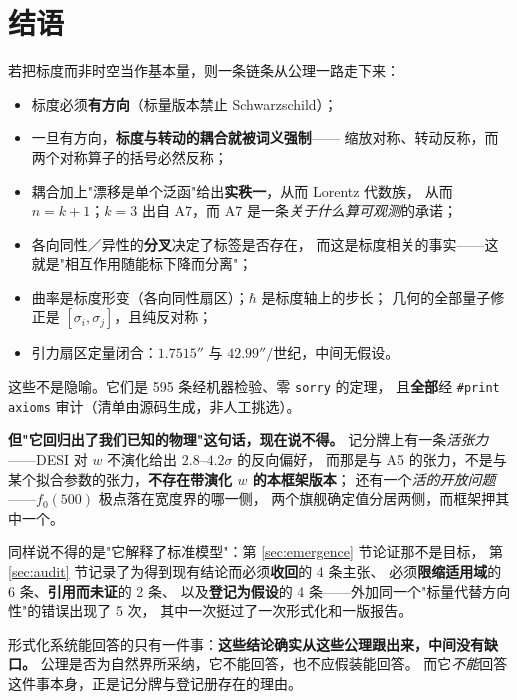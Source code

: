 \documentclass[11pt,a4paper]{article}
\theoremstyle{sudef}
\begin{document}
\section{结语}

若把标度而非时空当作基本量，则一条链条从公理一路走下来：

\begin{itemize}[leftmargin=1.6em,itemsep=2pt]
\item 标度必须\textbf{有方向}（标量版本禁止 Schwarzschild）；
\item 一旦有方向，\textbf{标度与转动的耦合就被词义强制}——
      缩放对称、转动反称，而两个对称算子的括号必然反称；
\item 耦合加上"漂移是单个泛函"给出\textbf{实秩一}，从而 Lorentz 代数族，
      从而 $n=k+1$；$k=3$ 出自 A7，而 A7 是一条\emph{关于什么算可观测}的承诺；
\item 各向同性／异性的\textbf{分叉}决定了标签是否存在，
      而这是标度相关的事实——这就是"相互作用随能标下降而分离"；
\item 曲率是标度形变（各向同性扇区）；$\hbar$ 是标度轴上的步长；
      几何的全部量子修正是 $[\sigma_i,\sigma_j]$，且纯反对称；
\item 引力扇区定量闭合：$1.7515''$ 与 $42.99''/$世纪，中间无假设。
\end{itemize}

\medskip
\noindent
这些不是隐喻。它们是 595 条经机器检验、零 \texttt{sorry} 的定理，
且\textbf{全部}经 \texttt{\#print axioms} 审计（清单由源码生成，非人工挑选）。

\medskip
\noindent\textbf{但"它回归出了我们已知的物理"这句话，现在说不得。}
记分牌上有一条\emph{活张力}——DESI 对 $w$ 不演化给出 $2.8$--$4.2\sigma$ 的反向偏好，
而那是与 A5 的张力，不是与某个拟合参数的张力，\textbf{不存在带演化 $w$ 的本框架版本}；
还有一个\emph{活的开放问题}——$f_0(500)$ 极点落在宽度界的哪一侧，
两个旗舰确定值分居两侧，而框架押其中一个。

\medskip
\noindent
同样说不得的是"它解释了标准模型"：第 \ref{sec:emergence} 节论证那不是目标，
第 \ref{sec:audit} 节记录了为得到现有结论而必须\textbf{收回}的 4 条主张、
必须\textbf{限缩适用域}的 6 条、\textbf{引用而未证}的 2 条、
以及\textbf{登记为假设}的 4 条——外加同一个"标量代替方向性"的错误出现了 5 次，
其中一次挺过了一次形式化和一版报告。

\medskip
\noindent
形式化系统能回答的只有一件事：\textbf{这些结论确实从这些公理跟出来，中间没有缺口。}
公理是否为自然界所采纳，它不能回答，也不应假装能回答。
而它\emph{不能}回答这件事本身，正是记分牌与登记册存在的理由。
\end{document}

